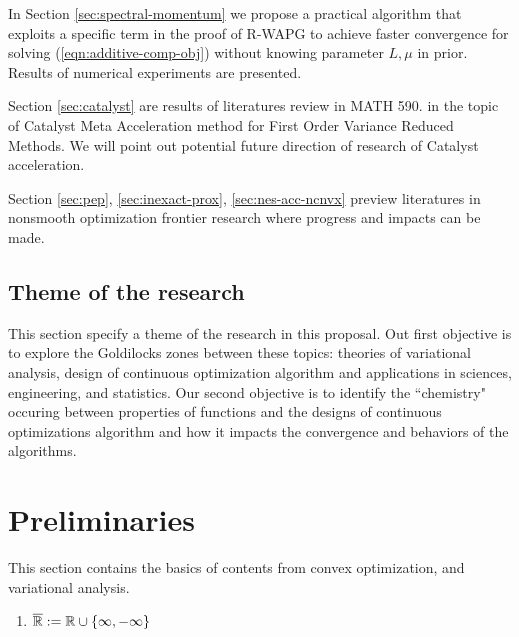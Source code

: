 \documentclass[12pt]{article}
\begin{document}
    In Section \ref{sec:spectral-momentum} we propose a practical algorithm that exploits a specific term in the proof of R-WAPG to achieve faster convergence for solving (\ref{eqn:additive-comp-obj}) without knowing parameter $L, \mu$ in prior. 
    Results of numerical experiments are presented. 
    \par
    Section \ref{sec:catalyst} are results of literatures review in MATH 590. 
     in the topic of Catalyst Meta Acceleration method for First Order Variance Reduced Methods. 
    We will point out potential future direction of research of Catalyst acceleration. 
    \par
    Section \ref{sec:pep}, \ref{sec:inexact-prox}, \ref{sec:nes-acc-ncnvx} preview literatures in  nonsmooth optimization frontier research where progress and impacts can be made.  
    \subsection{Theme of the research}
        This section specify a theme of the research in this proposal. 
        Out first objective is to explore the Goldilocks zones between these topics: theories of variational analysis, design of continuous optimization algorithm and applications in sciences, engineering, and statistics.  
        Our second objective is to identify the ``chemistry" occuring between properties of functions and the designs of continuous optimizations algorithm and how it impacts the convergence and behaviors of the algorithms. 


    
\section{Preliminaries}
    This section contains the basics of contents from convex optimization, and variational analysis. 
    \begin{enumerate}
        \item $\overline {\mathbb R} := \mathbb R \cup \{\infty, -\infty\}$
    \end{enumerate}
\end{document}
